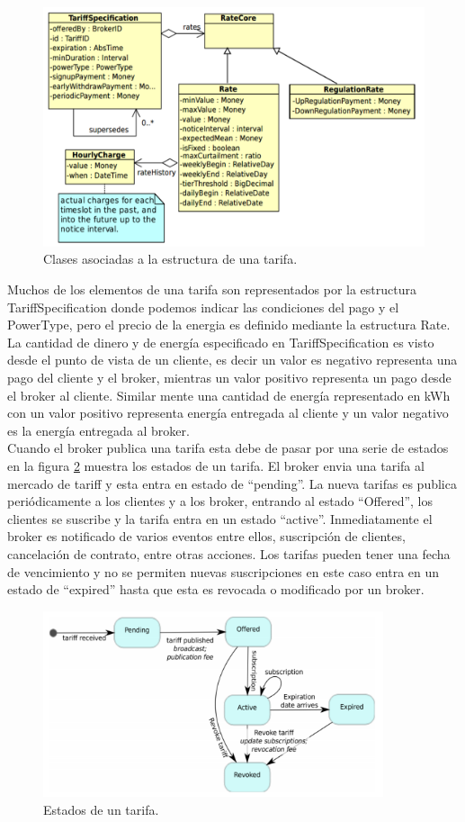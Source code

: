 \begin{figure}[!h]
	\centering
	\includegraphics[width=13cm]{img/tariffstructe.png}
	\caption{Clases asociadas a la estructura de una tarifa.}
	\label{tariff}
\end{figure}

Muchos de los elementos de una tarifa son representados por la estructura TariffSpecification donde podemos indicar las condiciones del pago y el PowerType, pero el precio de la energia es definido mediante la estructura Rate. La cantidad de dinero y de energía especificado en TariffSpecification es visto desde el punto de vista de un cliente, es decir  un valor es negativo representa una pago del cliente y el broker, mientras un valor positivo representa un pago desde el broker al cliente. Similar mente una cantidad de energía representado en kWh con un valor positivo representa energía entregada al cliente y un valor negativo es la energía entregada al broker.\\

Cuando el broker publica una tarifa esta debe de pasar por una serie de estados en la figura \ref{state} muestra los estados de un tarifa. El broker envia una tarifa al mercado de tariff y esta entra en estado de “pending”. La nueva tarifas es publica periódicamente a los clientes y a los broker, entrando al estado “Offered”, los clientes se suscribe y la tarifa entra en un estado “active”. Inmediatamente el broker es notificado de varios eventos entre ellos, suscripción de clientes, cancelación de contrato, entre otras acciones. Los tarifas pueden tener una fecha de vencimiento y no se permiten nuevas suscripciones en este caso entra en un estado de “expired” hasta que esta es revocada o modificado por un broker.

\begin{figure}[h!]
	\centering
	\includegraphics[width=10cm]{img/state.png}
	\caption{Estados de un tarifa.}
	\label{state}
\end{figure}

